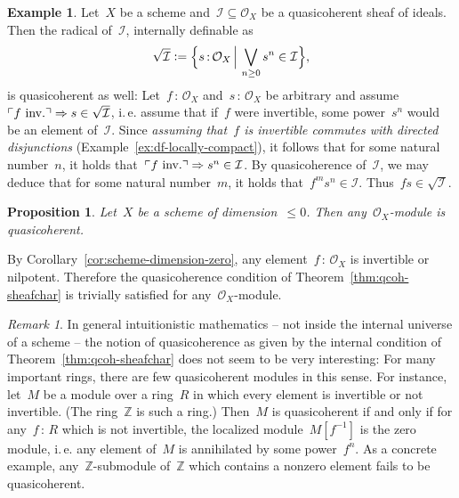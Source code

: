 \documentclass[10pt,reqno,a4paper]{amsbook}
\makeatletter
\theoremstyle{definition}
\newtheorem{ex}[defn]{Example}
\theoremstyle{plain}
\newtheorem{prop}[defn]{Proposition}
\theoremstyle{remark}
\newtheorem{rem}[defn]{Remark}
\newcommand{\ZZ}{\mathbb{Z}}
\newcommand{\A}{\mathcal{A}}
\renewcommand{\O}{\mathcal{O}}
\newcommand{\I}{\mathcal{I}}
\newcommand{\?}{\,{:}\,}
\renewcommand{\_}{\mathpunct{.}\,}
\newcommand{\speak}[1]{\ulcorner\text{\textnormal{#1}}\urcorner}
\newcommand{\ie}{i.\,e.\@\xspace}
\newcommand{\inv}{inv.\@}
\newcommand{\defeq}{\vcentcolon=}
\renewenvironment{proof}[1][\proofname]{\par
  \pushQED{\qed}%
  \normalfont \topsep6\p@\@plus6\p@\relax
  \trivlist
  \item[\hskip\labelsep
        \itshape
    #1\@addpunct{.}]\ignorespaces
}{%
  \popQED\endtrivlist\@endpefalse
}
\makeatother
\begin{document}
\begin{ex}\label{ex:radical-qcoh} Let~$X$ be a scheme and~$\I \subseteq \O_X$
be a quasicoherent sheaf of ideals.  Then the radical of~$\I$, internally definable
as \[ \sqrt{\I} \defeq \Bigl\{ s\?\O_X \,\Big|\, \bigvee_{n \geq 0} s^n \in \I \Bigr\}, \] is
quasicoherent as well: Let~$f\?\O_X$ and~$s\?\O_X$ be arbitrary and
assume~$\speak{$f$ \inv} \Rightarrow s \in \sqrt{\I}$, \ie assume that if~$f$
were invertible, some power~$s^n$ would be an element of~$\I$. Since
\emph{assuming that~$f$ is invertible commutes with directed disjunctions}
(Example~\ref{ex:df-locally-compact}), it follows that for some natural
number~$n$, it holds that~$\speak{$f$ \inv} \Rightarrow s^n \in \I$. By
quasicoherence of~$\I$, we may deduce that for some natural number~$m$, it
holds that~$f^m s^n \in \I$. Thus~$fs \in \sqrt{\I}$.\end{ex}


\begin{prop}Let~$X$ be a scheme of dimension~$\leq 0$. Then any~$\O_X$-module
is quasicoherent.\end{prop}
\begin{proof}By Corollary~\ref{cor:scheme-dimension-zero}, any
element~$f\?\O_X$ is invertible or nilpotent. Therefore the quasicoherence
condition of Theorem~\ref{thm:qcoh-sheafchar} is trivially satisfied for any~$\O_X$-module.
\end{proof}

\begin{rem}\label{rem:qcoh-in-constructive-mathematics}
In general intuitionistic mathematics -- not inside the internal universe of a
scheme -- the notion of quasicoherence as given by the internal condition of
Theorem~\ref{thm:qcoh-sheafchar}
does not seem to be very interesting: For many important rings, there are few
quasicoherent modules in this sense. For instance, let~$M$ be a module over a
ring~$R$ in which every element is invertible or not invertible. (The
ring~$\ZZ$ is such a ring.) Then~$M$ is quasicoherent if and only if for any~$f
\? R$ which is not invertible, the localized module~$M[f^{-1}]$ is the zero
module, \ie any element of~$M$ is annihilated by some power~$f^n$. As a
concrete example, any~$\ZZ$-submodule of~$\ZZ$ which contains a nonzero element
fails to be quasicoherent.
\end{rem}
\end{document}
